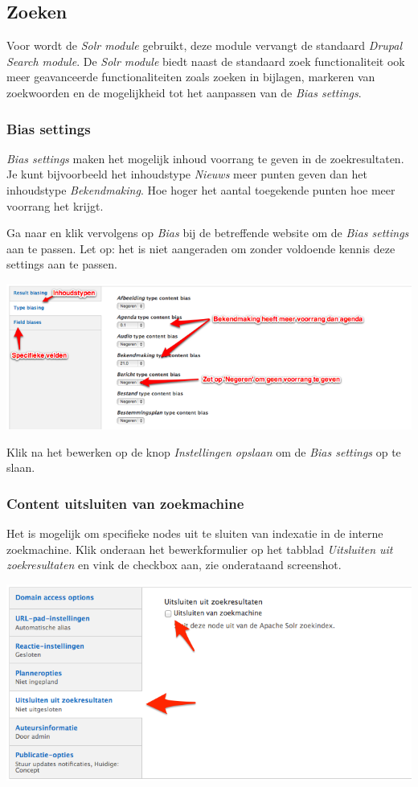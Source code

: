
\subsection{Zoeken}\label{zoeken}

Voor \drupalpath wordt de \emph{Solr module} gebruikt, deze module vervangt de standaard \emph{Drupal Search module}. 
De \emph{Solr module} biedt naast de standaard zoek functionaliteit ook meer geavanceerde functionaliteiten zoals zoeken in bijlagen, markeren van zoekwoorden en de mogelijkheid tot het aanpassen van de \emph{Bias settings}. 

\subsubsection{Bias settings}

\emph{Bias settings} maken het mogelijk inhoud voorrang te geven in de zoekresultaten. Je kunt bijvoorbeeld het inhoudstype \emph{Nieuws} meer punten geven dan het inhoudstype \emph{Bekendmaking}. Hoe hoger het aantal toegekende punten hoe meer voorrang het krijgt. 

Ga naar  en klik vervolgens op \emph{Bias} bij de betreffende website om de \emph{Bias settings} aan te passen. Let op: het is niet aangeraden om zonder voldoende kennis deze settings aan te passen.

\begin{center}
	\includegraphics[width=\textwidth]{img/bias.png}
\end{center}

Klik na het bewerken op de knop \emph{Instellingen opslaan} om de \emph{Bias settings} op te slaan. 

\subsubsection{Content uitsluiten van zoekmachine}

Het is mogelijk om specifieke nodes uit te sluiten van indexatie in de interne zoekmachine. Klik onderaan het bewerkformulier op het tabblad \emph{Uitsluiten uit zoekresultaten} en vink de checkbox aan, zie onderataand screenshot.

\begin{center}
	\includegraphics[width=\textwidth]{img/solr-exclude.png}
\end{center}

